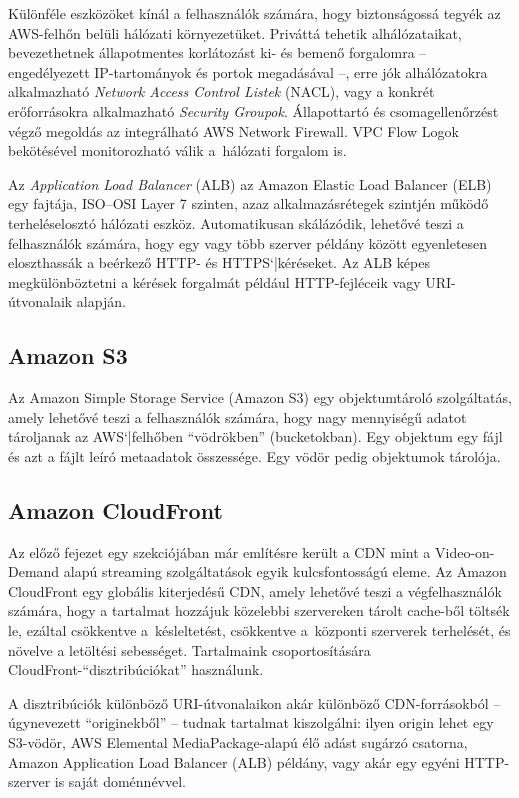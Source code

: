 Különféle eszközöket kínál a felhasználók számára, hogy biztonságossá tegyék az AWS-felhőn belüli hálózati környezetüket. Priváttá tehetik alhálózataikat, bevezethetnek állapotmentes korlátozást ki- és bemenő forgalomra -- engedélyezett IP-tartományok és portok megadásával --, erre jók alhálózatokra alkalmazható \emph{Network Access Control Listek} (NACL), vagy a konkrét erőforrásokra alkalmazható \emph{Security Groupok}. Állapottartó és csomagellenőrzést végző megoldás az integrálható AWS Network Firewall. VPC Flow Logok bekötésével monitorozható válik a~hálózati forgalom is.

Az \emph{Application Load Balancer} (ALB) az Amazon Elastic Load Balancer (ELB) egy fajtája, ISO--OSI Layer 7 szinten, azaz alkalmazásrétegek szintjén működő terheléselosztó hálózati eszköz. Automatikusan skálázódik, lehetővé teszi a felhasználók számára, hogy egy vagy több szerver példány között egyenletesen eloszthassák a beérkező HTTP- és HTTPS`|kéréseket. Az ALB képes megkülönböztetni a kérések forgalmát például HTTP-fejléceik vagy URI-útvonalaik alapján.

\subsection{Amazon S3}

Az Amazon Simple Storage Service (Amazon S3) egy objektumtároló szolgáltatás, amely lehetővé teszi a felhasználók számára, hogy nagy mennyiségű adatot tároljanak az AWS`|felhőben ``vödrökben'' (bucketokban). Egy objektum egy fájl és azt a fájlt leíró metaadatok összessége. Egy vödör pedig objektumok tárolója.

\subsection{Amazon CloudFront}

Az előző fejezet egy szekciójában már említésre került a CDN mint a Video-on-Demand alapú streaming szolgáltatások egyik kulcsfontosságú eleme. Az Amazon CloudFront egy globális kiterjedésű CDN\cite{cdn}, amely lehetővé teszi a végfelhasználók számára, hogy a tartalmat hozzájuk közelebbi szervereken tárolt cache-ből töltsék le, ezáltal csökkentve a~késleltetést, csökkentve a~központi szerverek terhelését, és növelve a letöltési sebességet. Tartalmaink csoportosítására CloudFront-``disztribúciókat'' használunk.

A disztribúciók különböző URI-útvonalaikon akár különböző CDN-forrásokból -- úgynevezett ``originekből'' -- tudnak tartalmat kiszolgálni: ilyen origin lehet egy S3-vödör, AWS Elemental MediaPackage-alapú élő adást sugárzó csatorna, Amazon Application Load Balancer (ALB) példány, vagy akár egy egyéni HTTP-szerver is saját doménnévvel.

